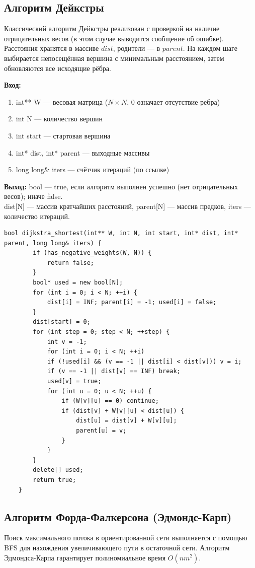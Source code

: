 \subsection{Алгоритм Дейкстры}
Классический алгоритм Дейкстры реализован с проверкой на наличие отрицательных весов (в этом случае выводится сообщение об ошибке). Расстояния хранятся в массиве $dist$, родители — в $parent$. На каждом шаге выбирается непосещённая вершина с минимальным расстоянием, затем обновляются все исходящие рёбра.

\noindent\textbf{Вход:}
\begin{enumerate}
	\item int** W — весовая матрица ($N \times N$, 0 означает отсутствие ребра)
	\item int N — количество вершин
	\item int start — стартовая вершина
	\item int* dist, int* parent — выходные массивы
	\item long long\& iters — счётчик итераций (по ссылке)
\end{enumerate}
\noindent\textbf{Выход:}
bool — true, если алгоритм выполнен успешно (нет отрицательных весов); иначе false. \\
dist[N] — массив кратчайших расстояний, parent[N] — массив предков, iters — количество итераций.

\begin{lstlisting}[caption=Дейкстра (shortest\_paths.cpp)]
	bool dijkstra_shortest(int** W, int N, int start, int* dist, int* parent, long long& iters) {
		if (has_negative_weights(W, N)) {
			return false;
		}
		bool* used = new bool[N];
		for (int i = 0; i < N; ++i) {
			dist[i] = INF; parent[i] = -1; used[i] = false;
		}
		dist[start] = 0;
		for (int step = 0; step < N; ++step) {
			int v = -1;
			for (int i = 0; i < N; ++i)
			if (!used[i] && (v == -1 || dist[i] < dist[v])) v = i;
			if (v == -1 || dist[v] == INF) break;
			used[v] = true;
			for (int u = 0; u < N; ++u) {
				if (W[v][u] == 0) continue;
				if (dist[v] + W[v][u] < dist[u]) {
					dist[u] = dist[v] + W[v][u];
					parent[u] = v;
				}
			}
		}
		delete[] used;
		return true;
	}
\end{lstlisting}

\subsection{Алгоритм Форда-Фалкерсона (Эдмондс-Карп)}
Поиск максимального потока в ориентированной сети выполняется с помощью BFS для нахождения увеличивающего пути в остаточной сети. Алгоритм Эдмондса-Карпа гарантирует полиномиальное время $O(nm^2)$.


